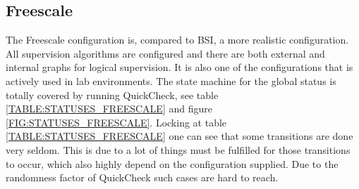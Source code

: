 \subsection{Freescale}
The Freescale configuration is, compared to BSI, a more realistic
configuration.  All supervision algorithms are configured and there
are both external and internal graphs for logical supervision. It is
also one of the configurations that is actively used in lab
environments. The state machine for the global status is totally
covered by running QuickCheck, see table
\ref{TABLE:STATUSES_FREESCALE} and figure
\ref{FIG:STATUSES_FREESCALE}. Locking at table \ref{TABLE:STATUSES_FREESCALE}
one can see that some transitions are done very seldom. This is due to a lot of
things must be fulfilled for those transitions to occur, which also highly depend on
the configuration supplied. Due to the randomness factor of QuickCheck such cases are
hard to reach.


